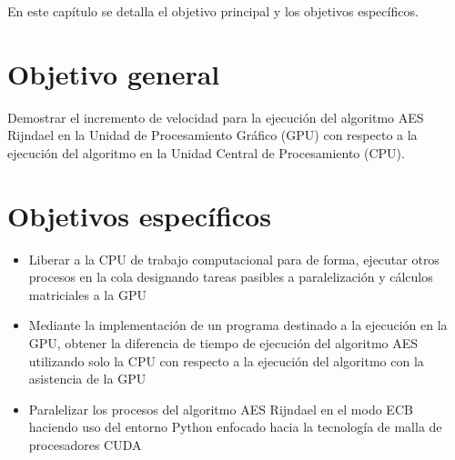 \documentclass[../main/main.tex]{subfiles}
\begin{document}
\espacio

  En este capítulo se detalla el objetivo principal y los objetivos específicos.

  \section{Objetivo general}

  Demostrar el incremento de velocidad para la ejecución del algoritmo AES Rijndael en la Unidad de Procesamiento Gráfico (GPU) con respecto a la ejecución del algoritmo en la Unidad Central de Procesamiento (CPU).

  \section{Objetivos específicos}

  \begin{itemize}
    \item Liberar a la CPU de trabajo computacional para de forma, ejecutar otros procesos en la cola designando tareas pasibles a paralelización y cálculos matriciales a la GPU
    \item Mediante la implementación de un programa destinado a la ejecución en la GPU, obtener la diferencia de tiempo de ejecución del algoritmo AES utilizando solo la CPU con respecto a la ejecución del algoritmo con la asistencia de la GPU
    \item Paralelizar los procesos del algoritmo AES Rijndael en el modo ECB haciendo uso del entorno Python enfocado hacia la tecnología de malla de procesadores CUDA
  \end{itemize}

  \bibliografia
\end{document}
